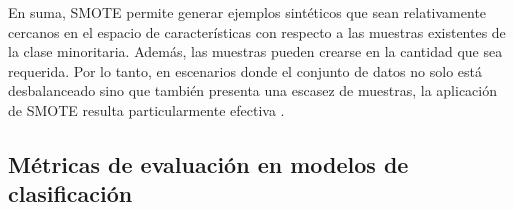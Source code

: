 

En suma, SMOTE permite generar ejemplos sintéticos que sean relativamente cercanos en el espacio de 
características con respecto a las muestras existentes de la clase minoritaria. Además, las muestras 
pueden crearse en la cantidad que sea requerida. Por lo tanto, en escenarios donde el conjunto de 
datos no solo está desbalanceado sino que también presenta una escasez de muestras, la aplicación 
de SMOTE resulta particularmente efectiva \citep{CITE:37} \citep{CITE:38}.



\subsection{Métricas de evaluación en modelos de clasificación}
